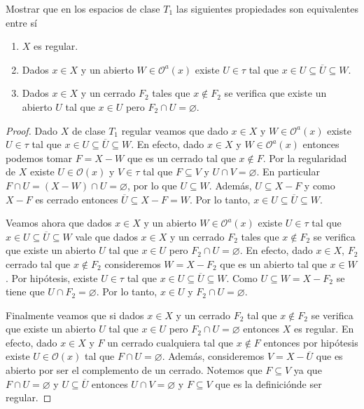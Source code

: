 \documentclass{article}
\theoremstyle{definition}
\newenvironment{ejercicio}[1]{\begin{trivlist}
\item[\hskip \labelsep {\bfseries Ejercicio}\hskip \labelsep {\bfseries #1.}]}{\end{trivlist}}
\begin{document}
\begin{ejercicio}{4}
    Mostrar que en los espacios de clase \(T_{1}\) las siguientes propiedades son equivalentes entre sí
    \begin{enumerate}
        \item \(X\) es regular.
        \item Dados \(x\in X\) y un abierto \( W \in \mathcal{O}^{a}(x)\) existe \( U \in \tau \) tal que \(x \in U \subseteq \overline{U} \subseteq W\).
        \item Dados \(x\in X\) y un cerrado \(F_2\) tales que \( x \notin F_2 \) se verifica que existe un abierto \(U\) tal que \(x \in U\) pero \(F_2 \cap U = \varnothing \).
    \end{enumerate}
\end{ejercicio}
\begin{proof}
    Dado \( X \) de clase \( T_1 \) regular veamos que dado \(x \in X \) y \( W \in \mathcal{O}^a(x) \) existe \( U \in \tau \) tal que \( x \in U \subseteq \overline{U} \subseteq W \).
    En efecto, dado \( x \in X \) y \( W \in \mathcal{O}^a(x) \) entonces podemos tomar \( F = X - W \) que es un cerrado tal que \( x \notin F \).
    Por la regularidad de \( X \) existe \( U \in \mathcal{O}(x) \) y \( V \in \tau \) tal que \( F \subseteq V \) y \( U \cap V = \varnothing \). En particular \( F \cap U = (X-W) \cap U = \varnothing \), por lo que \( U \subseteq W \). Además, \( U \subseteq X - F \) y como \( X - F \) es cerrado entonces \( \overline{U} \subseteq X - F = W \). Por lo tanto, \( x \in U \subseteq \overline{U} \subseteq W \).

    Veamos ahora que dados \(x \in X\) y un abierto \(W \in \mathcal{O}^{a}(x)\) existe \(U \in \tau \) tal que \(x \in U \subseteq \overline{U} \subseteq W\) vale que dados \(x \in X\) y un cerrado \(F_{2}\) tales que \(x \notin F_{2}\) se verifica que existe un abierto \(U\) tal que \(x\in U\) pero \(F_{2} \cap U = \varnothing \).
    En efecto, dado \( x \in X \), \( F_2 \) cerrado tal que \( x \notin F_2 \) consideremos \( W = X - F_2 \) que es un abierto tal que \( x \in W \). Por hipótesis, existe \( U \in \tau \) tal que \( x \in U \subseteq \overline{U} \subseteq W \). Como \( U \subseteq W = X - F_2 \) se tiene que \( U \cap F_2 = \varnothing \). Por lo tanto, \( x \in U \) y \( F_2 \cap U = \varnothing \).

    Finalmente veamos que si dados \( x \in X \) y un cerrado \( F_2 \) tal que \( x \notin F_2 \) se verifica que existe un abierto \( U \) tal que \( x \in U \) pero \( F_2 \cap U = \varnothing \) entonces \( X \) es regular.
    En efecto, dado \( x \in X \) y \( F \) un cerrado cualquiera tal que \( x \notin F \) entonces por hipótesis existe \( U \in \mathcal{O}(x) \) tal que \( F \cap U = \varnothing \).
    Además, consideremos \( V = X - \overline{U} \) que es abierto por ser el complemento de un cerrado. Notemos que \( F \subseteq V \) ya que \( F \cap U = \varnothing \) y \( U \subseteq \overline{U} \) entonces \( U \cap V = \varnothing \) y \( F \subseteq V \) que es la definiciónde ser regular.
\end{proof}
\end{document}

